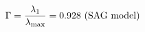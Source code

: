 \documentclass[preview]{standalone}
\begin{document}
\begin{align*}
\special{dvisvgm:raw <g id='unique000'>}\Gamma = \frac{\lambda_1}{\lambda_{\max}} = 0.928 \text{ (SAG model)}\special{dvisvgm:raw </g>}
\end{align*}
\end{document}

